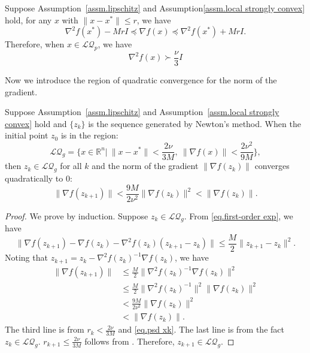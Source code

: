 \documentclass{mcom-l}
\numberwithin{equation}{section}
\begin{document}
\begin{lemma}
    Suppose Assumption~\ref{assm.lipschitz} and Assumption\ref{assm.local strongly convex} hold, for any $x$ with $\|x-x^*\| \leq r$, we have
    \begin{equation}
        \label{eq.psd region}
        \nabla^2 f(x^*)-MrI\preceq \nabla f(x) \preceq \nabla^2 f(x^*)+MrI.
    \end{equation}
    Therefore, when $x\in \mathcal{LQ}_p$, we have
    \begin{equation}
        \label{eq.psd xk}
        \nabla^2 f(x) \succ \frac{\nu}{3}I
    \end{equation}
\end{lemma}
Now we introduce the region of quadratic convergence for the norm of the gradient.
\begin{lemma}
    \label{lem.quadratic gradient}
    Suppose Assumption~\ref{assm.lipschitz} and Assumption~\ref{assm.local strongly convex} hold and $\{z_k\}$ is the sequence generated by Newton's method. When the initial point $z_0$ is in the region:
    \begin{equation}
        \label{eq.local quadratic region gradient}
        \mathcal{LQ}_g = \{x\in\mathbb{R}^n| \ \|x-x^*\| < \frac{2\nu}{3M}, \ \|\nabla f(x)\|< \frac{2\nu^2}{9M}\},
    \end{equation}
    then $z_k \in \mathcal{LQ}_g$ for all $k$ and the norm of the gradient $\|\nabla f(z_k)\|$ converges quadratically to $0$:
    \begin{equation}
        \label{eq.quadratic convergence gradient}
        \|\nabla f(z_{k+1})\| < \frac{9M}{2\nu^2}\|\nabla f(z_k)\|^2<\|\nabla f(z_k)\|.
    \end{equation}
\end{lemma}
\begin{proof}
    We prove by induction. Suppose $z_k\in \mathcal{LQ}_g$. From \eqref{eq.first-order exp}, we have
    \begin{equation*}
        \|\nabla f(z_{k+1}) -\nabla f(z_k)-\nabla^2 f(z_k)(z_{k+1}-z_k)\| \leq \frac{M}{2}\|z_{k+1}-z_k\|^2.
    \end{equation*}
    Noting that $z_{k+1} = z_k-\nabla^2 f(z_k)^{-1}\nabla f(z_k)$, we have
    \begin{equation*}
        \begin{aligned}
            \|\nabla f(z_{k+1})\| & \leq \frac{M}{2}\|\nabla^2 f(z_k)^{-1} \nabla f(z_k)\|^2       \\
                                  & \leq \frac{M}{2}\|\nabla^2 f(z_k)^{-1}\|^2\| \nabla f(z_k)\|^2 \\
                                  & < \frac{9M}{2\nu^2}\|\nabla f(z_k)\|^2                         \\
                                  & < \|\nabla f(z_k)\|.
        \end{aligned}
    \end{equation*}
    The third line is from $r_k< \frac{2\nu}{3M}$ and \eqref{eq.psd xk}. The last line is from the fact $z_k\in \mathcal{LQ}_g$. $r_{k+1} \leq \frac{2\nu}{3M}$ follows from . Therefore, $z_{k+1}\in \mathcal{LQ}_g$.
\end{proof}
\end{document}
